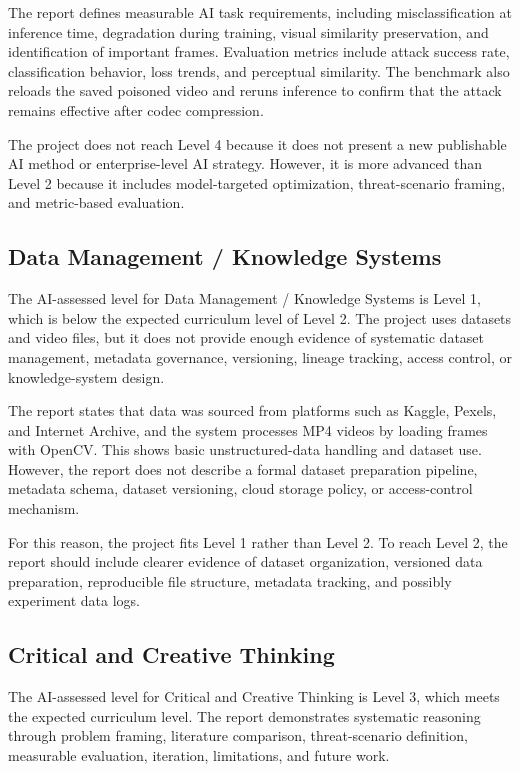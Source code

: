 The report defines measurable AI task requirements, including
misclassification at inference time, degradation during training,
visual similarity preservation, and identification of important
frames. Evaluation metrics include attack success rate, classification
behavior, loss trends, and perceptual similarity. The benchmark also
reloads the saved poisoned video and reruns inference to confirm that
the attack remains effective after codec compression.

The project does not reach Level 4 because it does not present a new
publishable AI method or enterprise-level AI strategy. However, it is
more advanced than Level 2 because it includes model-targeted
optimization, threat-scenario framing, and metric-based evaluation.

\subsection{Data Management / Knowledge Systems}
\label{subsection:data-management-evaluation}

The AI-assessed level for Data Management / Knowledge Systems is
Level 1, which is below the expected curriculum level of Level 2. The
project uses datasets and video files, but it does not provide enough
evidence of systematic dataset management, metadata governance,
versioning, lineage tracking, access control, or knowledge-system
design.

The report states that data was sourced from platforms such as Kaggle,
Pexels, and Internet Archive, and the system processes MP4 videos by
loading frames with OpenCV. This shows basic unstructured-data
handling and dataset use. However, the report does not describe a
formal dataset preparation pipeline, metadata schema, dataset
versioning, cloud storage policy, or access-control mechanism.

For this reason, the project fits Level 1 rather than Level 2. To
reach Level 2, the report should include clearer evidence of dataset
organization, versioned data preparation, reproducible file structure,
metadata tracking, and possibly experiment data logs.

\subsection{Critical and Creative Thinking}
\label{subsection:critical-thinking-evaluation}

The AI-assessed level for Critical and Creative Thinking is Level 3,
which meets the expected curriculum level. The report demonstrates
systematic reasoning through problem framing, literature comparison,
threat-scenario definition, measurable evaluation, iteration,
limitations, and future work.

